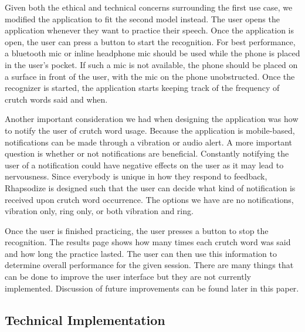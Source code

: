 \documentclass{sigchi}
\begin{document}
Given both the ethical and technical concerns surrounding the first use case, we modified the application to fit the second model instead. The user opens the application whenever they want to practice their speech. Once the application is open, the user can press a button to start the recognition. For best performance, a bluetooth mic or inline headphone mic should be used while the phone is placed in the user’s pocket. If such a mic is not available, the phone should be placed on a surface in front of the user, with the mic on the phone unobstructed. Once the recognizer is started, the application starts keeping track of the frequency of crutch words said and when. 

Another important consideration we had when designing the application was how to notify the user of crutch word usage. Because the application is mobile-based, notifications can be made through a vibration or audio alert. A more important question is whether or not notifications are beneficial. Constantly notifying the user of a notification could have negative effects on the user as it may lead to nervousness. Since everybody is unique in how they respond to feedback, Rhapsodize is designed such that the user can decide what kind of notification is received upon crutch word occurrence. The options we have are no notifications, vibration only, ring only, or both vibration and ring. 

Once the user is finished practicing, the user presses a button to stop the recognition. The results page shows how many times each crutch word was said and how long the practice lasted. The user can then use this information to determine overall performance for the given session. There are many things that can be done to improve the user interface but they are not currently implemented. Discussion of future improvements can be found later in this paper.

\subsection{Technical Implementation}
\end{document}
